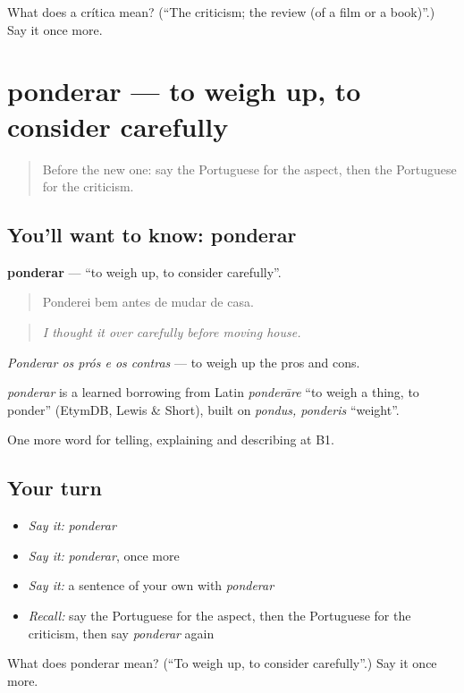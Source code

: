 \begin{tcolorbox}[breakable,colback=teal!4,colframe=teal!35!black,title={Before you move on}]
What does a crítica mean? (\textquotedblleft{}The criticism; the review (of a film or a book)\textquotedblright{}.) Say it once more.
\end{tcolorbox}
\section[ponderar]{ponderar — to weigh up, to consider carefully}

\label{lesson:PT-C345-ponderar}



\begin{quote}
Before the new one: say the Portuguese for the aspect, then the Portuguese for the criticism.
\end{quote}

\subsection*{You'll want to know: ponderar}
\textbf{ponderar} — \textquotedblleft{}to weigh up, to consider carefully\textquotedblright{}.

\begin{quote}
Ponderei bem antes de mudar de casa.
\end{quote}

\begin{quote}
\emph{I thought it over carefully before moving house.}
\end{quote}

\emph{Ponderar os prós e os contras} — to weigh up the pros and cons.

\begin{cousinweb}
\emph{ponderar} is a learned borrowing from Latin \emph{ponderāre} \textquotedblleft{}to weigh a thing, to ponder\textquotedblright{} (EtymDB, Lewis \& Short), built on \emph{pondus, ponderis} \textquotedblleft{}weight\textquotedblright{}.
\end{cousinweb}

\begin{grammarlens}[title={What you've built}]
One more word for telling, explaining and describing at B1.
\end{grammarlens}

\subsection*{Your turn}
\begin{itemize}
\raggedright
  \item \emph{Say it:} \emph{ponderar}
  \item \emph{Say it:} \emph{ponderar}, once more
  \item \emph{Say it:} a sentence of your own with \emph{ponderar}
  \item \emph{Recall:} say the Portuguese for the aspect, then the Portuguese for the criticism, then say \emph{ponderar} again
\end{itemize}

\begin{tcolorbox}[breakable,colback=teal!4,colframe=teal!35!black,title={Before you move on}]
What does ponderar mean? (\textquotedblleft{}To weigh up, to consider carefully\textquotedblright{}.) Say it once more.
\end{tcolorbox}
